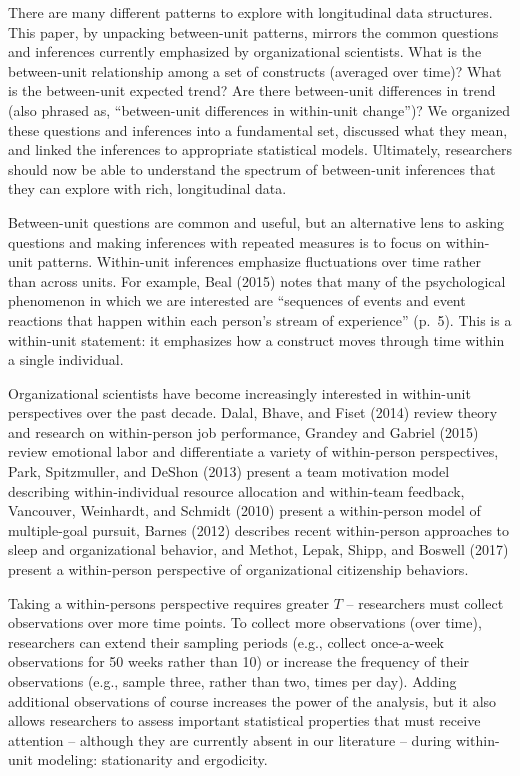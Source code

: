 \documentclass[english,,man]{apa6}
\theoremstyle{definition}
\theoremstyle{definition}
\theoremstyle{definition}
\theoremstyle{remark}
\begin{document}
There are many different patterns to explore with longitudinal data
structures. This paper, by unpacking between-unit patterns, mirrors the
common questions and inferences currently emphasized by organizational
scientists. What is the between-unit relationship among a set of
constructs (averaged over time)? What is the between-unit expected
trend? Are there between-unit differences in trend (also phrased as,
\enquote{between-unit differences in within-unit change})? We organized
these questions and inferences into a fundamental set, discussed what
they mean, and linked the inferences to appropriate statistical models.
Ultimately, researchers should now be able to understand the spectrum of
between-unit inferences that they can explore with rich, longitudinal
data.

Between-unit questions are common and useful, but an alternative lens to
asking questions and making inferences with repeated measures is to
focus on within-unit patterns. Within-unit inferences emphasize
fluctuations over time rather than across units. For example, Beal
(2015) notes that many of the psychological phenomenon in which we are
interested are \enquote{sequences of events and event reactions that
happen within each person's stream of experience} (p.~5). This is a
within-unit statement: it emphasizes how a construct moves through time
within a single individual.

Organizational scientists have become increasingly interested in
within-unit perspectives over the past decade. Dalal, Bhave, and Fiset
(2014) review theory and research on within-person job performance,
Grandey and Gabriel (2015) review emotional labor and differentiate a
variety of within-person perspectives, Park, Spitzmuller, and DeShon
(2013) present a team motivation model describing within-individual
resource allocation and within-team feedback, Vancouver, Weinhardt, and
Schmidt (2010) present a within-person model of multiple-goal pursuit,
Barnes (2012) describes recent within-person approaches to sleep and
organizational behavior, and Methot, Lepak, Shipp, and Boswell (2017)
present a within-person perspective of organizational citizenship
behaviors.

Taking a within-persons perspective requires greater \(T\) --
researchers must collect observations over more time points. To collect
more observations (over time), researchers can extend their sampling
periods (e.g., collect once-a-week observations for 50 weeks rather than
10) or increase the frequency of their observations (e.g., sample three,
rather than two, times per day). Adding additional observations of
course increases the power of the analysis, but it also allows
researchers to assess important statistical properties that must receive
attention -- although they are currently absent in our literature --
during within-unit modeling: stationarity and ergodicity.
\end{document}
